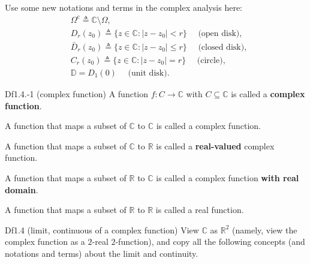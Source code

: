 \documentclass{article}
\begin{document}
\begin{Rmk}{}
    \textcolor{Df}{Use some new notations and terms in the complex analysis here:
    $$ 
    \begin{aligned}
        &\Omega^\text{c} \triangleq \mathbb{C}\setminus\Omega,\\
        &D_r(z_0) \triangleq \{z\in\mathbb{C}: |z-z_0|<r\} \quad\text{ (open disk)},\\
        &\bar{D}_r(z_0) \triangleq \{z\in\mathbb{C}: |z-z_0|\leq r\} \quad\text{ (closed disk)},\\
        &C_r(z_0) \triangleq \{z\in\mathbb{C}: |z-z_0| = r\} \quad\text{ (circle)},\\
        &\mathbb{D} = D_1(0) \quad\text{ (unit disk)}.
    \end{aligned}
    $$}
\end{Rmk}

\begin{Df}{Df1.4.-1 (complex function)}
    A function $f: C \rightarrow \mathbb{C}$ with $C\subseteq\mathbb{C}$ is called a \textbf{complex function}.
\end{Df}

\begin{Rmk}{}
    \begin{compactenum}
        \item A function that maps a subset of $\mathbb{C}$ to $\mathbb{C}$ is called a complex function.
        \item \textcolor{Df}{A function that maps a subset of $\mathbb{C}$ to $\mathbb{R}$ is called a \textbf{real-valued} complex function.}
        \item \textcolor{Df}{A function that maps a subset of $\mathbb{R}$ to $\mathbb{C}$ is called a complex function \textbf{with real domain}.}
        \item A function that maps a subset of $\mathbb{R}$ to $\mathbb{R}$ is called a real function.
    \end{compactenum}
\end{Rmk}

\begin{Df}{Df1.4 (limit, continuous of a complex function)}
    View $\mathbb{C}$ as $\mathbb{R}^2$ (namely, view the complex function as a $2$-real $2$-function), and copy all the following concepts (and notations and terms) about the limit and continuity.
\end{Df}
\end{document}
